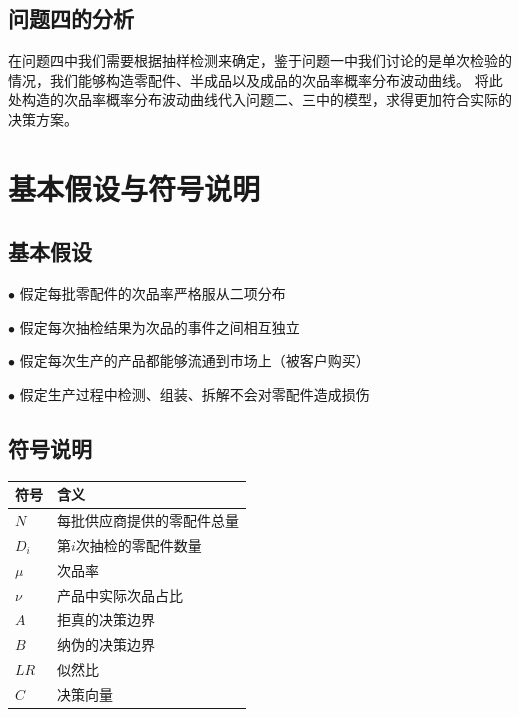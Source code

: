 \documentclass[withoutpreface,bwprint]{cumcmthesis} %
\begin{document}
\subsection{问题四的分析}
在问题四中我们需要根据抽样检测来确定，鉴于问题一中我们讨论的是单次检验的情况，我们能够构造零配件、半成品以及成品的次品率概率分布波动曲线。
将此处构造的次品率概率分布波动曲线代入问题二、三中的模型，求得更加符合实际的决策方案。
\section{基本假设与符号说明}
\subsection{基本假设}
$\bullet$ 假定每批零配件的次品率严格服从二项分布

$\bullet$ 假定每次抽检结果为次品的事件之间相互独立

$\bullet$ 假定每次生产的产品都能够流通到市场上（被客户购买）

$\bullet$ 假定生产过程中检测、组装、拆解不会对零配件造成损伤

\subsection{符号说明}
\begin{longtable}{m{3.5cm}<{\centering}m{10cm}<{\centering}}
	\toprule[1.5pt]
	\textbf{符号} & \textbf{含义}   \\ \midrule[1pt]
	\endfirsthead
	\endhead
	$N$         & 每批供应商提供的零配件总量 \\
	$D_{i}$     & 第$i$次抽检的零配件数量 \\
	$\mu$       & 次品率           \\
	$\nu$       & 产品中实际次品占比     \\
	$A$         & 拒真的决策边界       \\
	$B$         & 纳伪的决策边界       \\
	$LR$        & 似然比           \\
	$C$         & 决策向量          \\
	\bottomrule[1.5pt]
\end{longtable}
\end{document}
